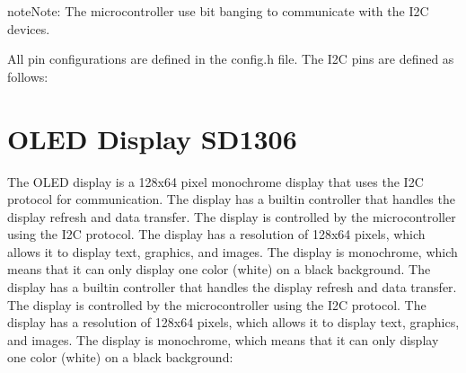 \documentclass[letterpaper,10pt,english]{sphinxmanual}
\begin{document}
\begin{sphinxadmonition}{note}{Note:}
\sphinxAtStartPar
The microcontroller use bit banging to communicate with the I2C devices.
\end{sphinxadmonition}

\sphinxAtStartPar
All pin configurations are defined in the config.h file. The I2C pins are defined as follows:

\begin{sphinxVerbatim}[commandchars=\\\{\}]
\end{sphinxVerbatim}


\section{OLED Display SD1306}
\label{\detokenize{i2c:oled-display-sd1306}}
\sphinxAtStartPar
The OLED display is a 128x64 pixel monochrome display that uses the I2C protocol for communication. The display has a built\sphinxhyphen{}in controller that handles the display refresh and data transfer. The display is controlled by the microcontroller using the I2C protocol. The display has a resolution of 128x64 pixels, which allows it to display text, graphics, and images. The display is monochrome, which means that it can only display one color (white) on a black background. The display has a built\sphinxhyphen{}in controller that handles the display refresh and data transfer. The display is controlled by the microcontroller using the I2C protocol. The display has a resolution of 128x64 pixels, which allows it to display text, graphics, and images. The display is monochrome, which means that it can only display one color (white) on a black background:
\end{document}
